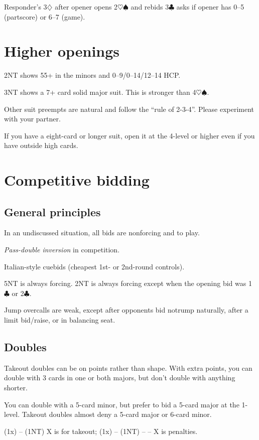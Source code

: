 \documentclass[a4paper, twoside, 11pt]{article}
\begin{document}
\begin{multicols}{3}
Responder's 3$\diamondsuit$ after opener opens 2$\heartsuit\spadesuit$ and rebids 3$\clubsuit$ asks if opener has 0--5 (partscore) or 6--7 (game).


\section{Higher openings}

2NT shows 55+ in the minors and 0--9/0--14/12--14 HCP.

3NT shows a 7+ card solid major suit. This is stronger than 4$\heartsuit\spadesuit$.

Other suit preempts are natural and follow the ``rule of 2-3-4''. Please experiment with your partner.

If you have a eight-card or longer suit, open it at the 4-level or higher even if you have outside high cards.
\section{Competitive bidding}
\subsection*{General principles}
In an undiscussed situation, all bids are nonforcing and to play.

\textit{Pass-double inversion} in competition.

Italian-style cuebids (cheapest 1st- or 2nd-round controls).



 5NT is always forcing. 2NT is always forcing except when the opening bid was 1$\clubsuit$ or 2$\clubsuit$.

 Jump overcalls are weak, except after opponents bid notrump naturally, after a limit bid/raise, or in balancing seat.

\subsection*{Doubles}

Takeout doubles can be on points rather than shape. With extra points, you can double with 3 cards in one or both majors, but don’t double with anything shorter.

You can double with a 5-card minor, but prefer to bid a 5-card major at the 1-level. Takeout doubles almost deny a 5-card major or 6-card minor.


(1x) -- (1NT) X is for takeout; (1x) -- (1NT) -- -- X is penalties.


\end{multicols}
\end{document}
